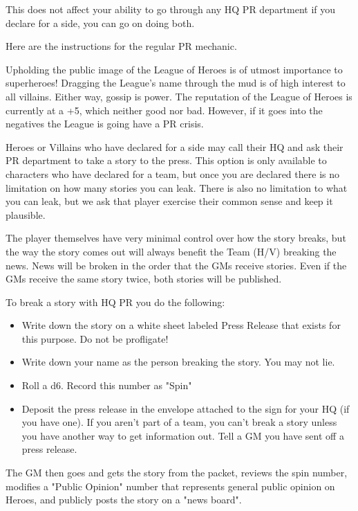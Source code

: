 \documentclass[green]{LRSguildcamp1}
\begin{document}
This does not affect your ability to go through any HQ PR department if you declare for a side, you can go on doing both. 


Here are the instructions for the regular PR mechanic. 

Upholding the public image of the League of Heroes is of utmost importance to superheroes! Dragging the League's name through the mud is of high interest to all villains. Either way, gossip is power. The reputation of the League of Heroes is currently at a +5, which neither good nor bad. However, if it goes into the negatives the League is going have a PR crisis. 

Heroes or Villains who have declared for a side may call their HQ and ask their PR department to take a story to the press. This option is only available to characters who have declared for a team, but once you are declared there is no limitation on how many stories you can leak. There is also no limitation to what you can leak, but we ask that player exercise their common sense and keep it plausible. 

The player themselves have very minimal control over how the story breaks, but the way the story comes out will always benefit the Team (H/V) breaking the news. News will be broken in the order that the GMs receive stories. Even if the GMs receive the same story twice, both stories will be published. 

To break a story with HQ PR you do the following:
\begin {itemize}
\item Write down the story on a white sheet labeled Press Release that exists for this purpose. Do not be profligate! 
\item Write down your name as the person breaking the story. You may not lie. 
\item Roll a d6. Record this number as "Spin"
\item Deposit the press release in the envelope attached to the sign for your HQ (if you have one). If you aren't part of a team, you can't break a story unless you have another way to get information out. Tell a GM you have sent off a press release.
\end {itemize}
The GM then goes and gets the story from the packet, reviews the spin number, modifies a "Public Opinion" number that represents general public opinion on Heroes, and publicly posts the story on a "news board". 
\end{document}
